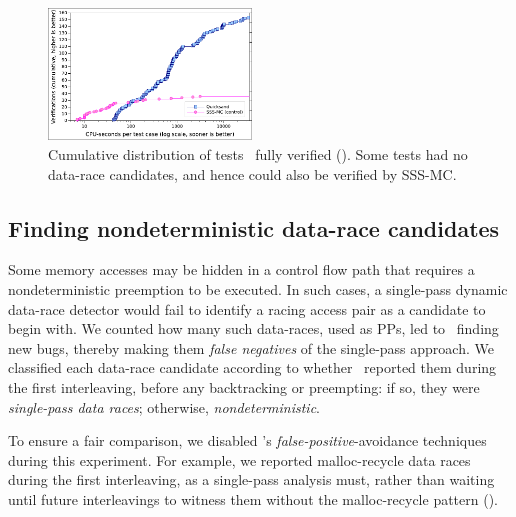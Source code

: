 \begin{figure}[t]
	\includegraphics[width=0.48\textwidth]{totalverifs-squashed.pdf}
	\caption{Cumulative distribution of tests \quicksand~fully verified (\sect{\ref{sec:totalverif}}).
	Some tests had no data-race candidates, and hence could also be verified by SSS-MC.}
	\label{fig:totalverif}
\end{figure}


\subsection{Finding nondeterministic data-race candidates}
\label{sec:eval-falseneg}

Some memory accesses may be hidden in a control flow path that requires a nondeterministic preemption to be executed.
In such cases, a single-pass dynamic data-race detector
would fail
to identify a racing access pair as a candidate to begin with.
%
We counted how many such data-races, used as PPs, led to \quicksand~finding new bugs,
thereby making them {\em false negatives} of the single-pass approach.
We classified each data-race candidate according to whether \landslide~reported them during the first interleaving,
before any backtracking or preempting:
if so, they were {\em single-pass data races}; otherwise, {\em nondeterministic}.

To ensure a fair comparison, we disabled \landslide's {\em false-positive}-avoidance techniques during this experiment.
For example, we reported malloc-recycle data races during the first interleaving, as a single-pass analysis must,
rather than waiting until future interleavings to witness them without the malloc-recycle pattern
(\sect{\ref{sec:recycle}}).

